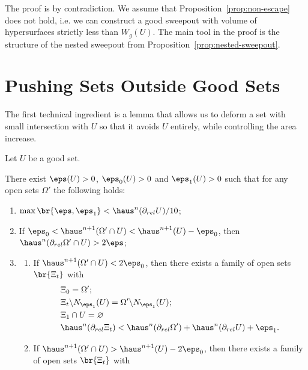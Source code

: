 The proof is by contradiction. We assume that Proposition~\ref{prop:non-escape} does not hold, i.e. we can construct a good sweepout with volume of hypersurfaces strictly less than $W_g(U)$. The main tool in the proof is the structure of the nested sweepout from Proposition~\ref{prop:nested-sweepout}.

\section{Pushing Sets Outside Good Sets}\label{sec:pushing-outside}

The first technical ingredient is a lemma that allows us to deform a set with small intersection with $U$ so that it avoids $U$ entirely, while controlling the area increase.

Let $U$ be a good set.
\begin{lemma}\label{lem:nested-sweepout-small-intersection}
    There exist $\eps(U) > 0$, $\eps_0(U) > 0$ and $\eps_1(U) > 0$ such that for any open sets $\Omega'$ the following holds:
    \begin{enumerate}
        \item $\max\br{\eps, \eps_1} < \haus^n(\partial_{rel}U)/10$;
        \item If $\eps_0 < \haus^{n + 1}(\Omega'\cap U) < \haus^{n + 1}(U) - \eps_0$, then $\haus^n(\partial_{rel}\Omega'\cap U) > 2\eps$;
        \item 
        \begin{enumerate}
            \item[(A)] If $\haus^{n + 1}(\Omega'\cap U) < 2\eps_0$, then there exists a family of open sets $\br{\Xi_t}$ with 
            \begin{equation*}
                \begin{split}
                    &\Xi_0 = \Omega';\\
                    &\Xi_t\backslash N_{\eps_1}(U) = \Omega'\backslash N_{\eps_1}(U);\\
                    &\Xi_1\cap U = \varnothing\\
                    &\haus^n(\partial_{rel}\Xi_t) < \haus^n(\partial_{rel}\Omega') + \haus^n(\partial_{rel}U) + \eps_1.
                \end{split}
            \end{equation*}
            \item[(B)] If $\haus^{n + 1}(\Omega'\cap U) > \haus^{n + 1}(U) - 2\eps_0$, then there exists a family of open sets $\br{\Xi_t}$ with
            \begin{equation*}

\end{equation*}
\end{enumerate}
\end{enumerate}
\end{lemma}
